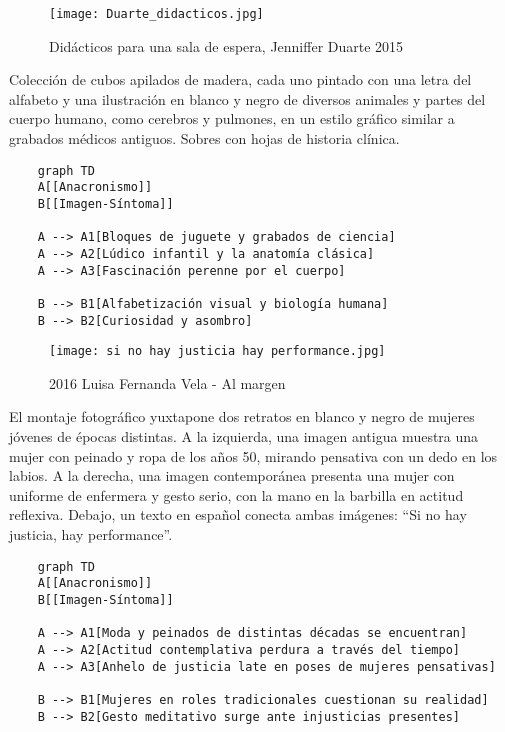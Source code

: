 \clearpage
\begin{figure}[h!]
    \centering
    \texttt{[image: Duarte\_didacticos.jpg]}
    \caption{Didácticos para una sala de espera, Jenniffer Duarte 2015}
    \label{fig:JennifferDuarte2015}
\end{figure}

Colección de cubos apilados de madera, cada uno pintado con una letra del alfabeto y una ilustración en blanco y negro de diversos animales y partes del cuerpo humano, como cerebros y pulmones, en un estilo gráfico similar a grabados médicos antiguos. Sobres con hojas de historia clínica.

\small
\singlespacing \begin{verbatim}
    graph TD
    A[[Anacronismo]]
    B[[Imagen-Síntoma]]

    A --> A1[Bloques de juguete y grabados de ciencia]
    A --> A2[Lúdico infantil y la anatomía clásica]
    A --> A3[Fascinación perenne por el cuerpo]

    B --> B1[Alfabetización visual y biología humana]
    B --> B2[Curiosidad y asombro]
\end{verbatim}
\normalsize

\clearpage
\begin{figure}[h!]
    \centering
    \texttt{[image: si no hay justicia hay performance.jpg]}
    \caption{2016 Luisa Fernanda Vela - Al margen}
    \label{fig:LuisaVela2016}
\end{figure}

El montaje fotográfico yuxtapone dos retratos en blanco y negro de mujeres jóvenes de épocas distintas. A la izquierda, una imagen antigua muestra una mujer con peinado y ropa de los años 50, mirando pensativa con un dedo en los labios. A la derecha, una imagen contemporánea presenta una mujer con uniforme de enfermera y gesto serio, con la mano en la barbilla en actitud reflexiva. Debajo, un texto en español conecta ambas imágenes: ``Si no hay justicia, hay performance''.

\small
\singlespacing \begin{verbatim}
    graph TD
    A[[Anacronismo]]
    B[[Imagen-Síntoma]]

    A --> A1[Moda y peinados de distintas décadas se encuentran]
    A --> A2[Actitud contemplativa perdura a través del tiempo]
    A --> A3[Anhelo de justicia late en poses de mujeres pensativas]

    B --> B1[Mujeres en roles tradicionales cuestionan su realidad]
    B --> B2[Gesto meditativo surge ante injusticias presentes]
\end{verbatim}
\normalsize